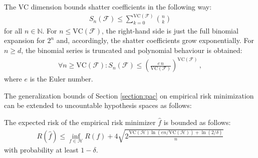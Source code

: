     \begin{property}\label{data:sauer_lemma}
        The VC dimension bounds shatter coefficients in the following way:
        \begin{gather}
            S_n(\mathcal{F})\leq\sum_{k=0}^{\mathrm{VC}(\mathcal{F})}\binom{n}{k}
        \end{gather}
        for all $n\in\mathbb{N}$. For $n\leq\mathrm{VC}(\mathcal{F})$, the right-hand side is just the full binomial expansion for $2^n$ and, accordingly, the shatter coefficients grow exponentially. For $n\geq d$, the binomial series is truncated and polynomial behaviour is obtained:
        \begin{gather}
            \forall n\geq\mathrm{VC}(\mathcal{F}):S_n(\mathcal{F})\leq\left(\frac{e\,n}{\mathrm{VC}(\mathcal{F})}\right)^{\mathrm{VC}(\mathcal{F})}\,,
        \end{gather}
        where $e$ is the Euler number.
    \end{property}

    The generalization bounds of Section \ref{section:pac} on empirical risk minimization can be extended to uncountable hypothesis spaces as follows:
    \begin{property}
        The expected risk of the empirical risk minimizer $\hat{f}$ is bounded as follows:
        \begin{gather}
            R(\hat{f})\leq\inf_{f\in\mathcal{H}}R(f)+4\sqrt{2\frac{\mathrm{VC}(\mathcal{H})\ln(en/\mathrm{VC}(\mathcal{H})) + \ln(2/\delta)}{n}}
        \end{gather}
        with probability at least $1-\delta$.
    \end{property}

